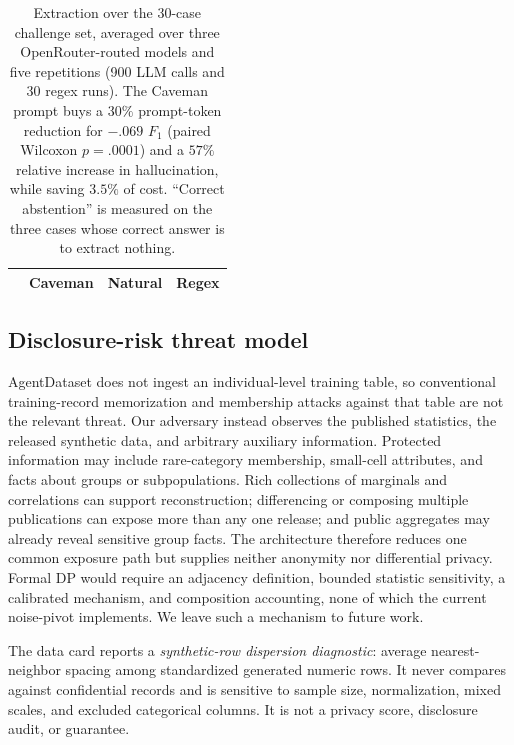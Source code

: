 \documentclass[letterpaper]{article} %
\begin{document}
\begin{table}[t]
\centering
\setlength{\tabcolsep}{4pt}
\begin{tabular}{lrrr}
\toprule
& Caveman & Natural & Regex \\
\midrule
%
\end{tabular}
\caption{Extraction over the 30-case challenge set, averaged over three
OpenRouter-routed models and five repetitions (900 LLM calls and 30 regex runs).
The Caveman prompt buys a $30\%$ prompt-token reduction for $-.069$ $F_1$
(paired Wilcoxon $p=.0001$) and a $57\%$ relative increase in hallucination,
while saving $3.5\%$ of cost. ``Correct abstention'' is measured on the three
cases whose correct answer is to extract nothing.}
\label{tab:extraction}
\end{table}

\subsection{Disclosure-risk threat model}
AgentDataset does not ingest an individual-level training table, so conventional
training-record memorization and membership attacks against that table are not
the relevant threat. Our adversary instead observes the published statistics,
the released synthetic data, and arbitrary auxiliary information. Protected
information may include rare-category membership, small-cell attributes, and
facts about groups or subpopulations. Rich collections of marginals and
correlations can support reconstruction; differencing or composing multiple
publications can expose more than any one release; and public aggregates may
already reveal sensitive group facts. The architecture therefore reduces one
common exposure path but supplies neither anonymity nor differential privacy.
Formal DP would require an adjacency definition, bounded statistic sensitivity,
a calibrated mechanism, and composition accounting, none of which the current
noise-pivot implements. We leave such a mechanism to future work.

The data card reports a \emph{synthetic-row dispersion diagnostic}: average
nearest-neighbor spacing among standardized generated numeric rows. It never
compares against confidential records and is sensitive to sample size,
normalization, mixed scales, and excluded categorical columns. It is not a
privacy score, disclosure audit, or guarantee.
\end{document}
